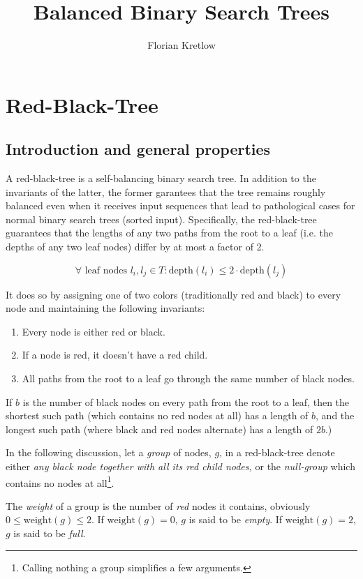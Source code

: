 \documentclass{article}
\title{Balanced Binary Search Trees}
\author{Florian Kretlow}
\begin{document}
\section{Red-Black-Tree}

\subsection{Introduction and general properties}
A red-black-tree is a self-balancing binary search tree. In addition to the invariants
of the latter, the former garantees that the tree remains roughly balanced even when it
receives input sequences that lead to pathological cases for normal binary search trees
(sorted input). Specifically, the red-black-tree guarantees that the lengths of any two
paths from the root to a leaf (i.e. the depths of any two leaf nodes) differ by at most
a factor of 2.

\[
\forall \text{ leaf nodes } l_{i}, l_{j} \in T : \text{depth}(l_i) \leq 2 \cdot
\text{depth}(l_j)
\]

It does so by assigning one of two colors (traditionally red and black) to
every node and maintaining the following invariants:

\begin{enumerate}[label=(\arabic*)]
\item Every node is either red or black.
\item If a node is red, it doesn't have a red child.
\item All paths from the root to a leaf go through the same number of black nodes.
\end{enumerate}

If \(b\) is the number of black nodes on every path from the root to a leaf, then
the shortest such path (which contains no red nodes at all) has a length of \(b\), and
the longest such path (where black and red nodes alternate) has a length of
\(2b\).)


In the following discussion, let a \emph{group} of nodes, \(g\), in a red-black-tree
denote either \emph{any black node together with all its red child nodes,} or the
\emph{null-group} which contains no nodes at all\footnote{Calling nothing a group
simplifies a few arguments.}.

The \emph{weight} of a group is the
number of \emph{red} nodes it contains, obviously \(0 \leq \text{weight}(g) \leq 2\). If
\(\text{weight}(g) = 0\), \(g\) is said to be \emph{empty}. If \(\text{weight}(g) = 2\),
\(g\) is said to be \emph{full}.
\end{document}
